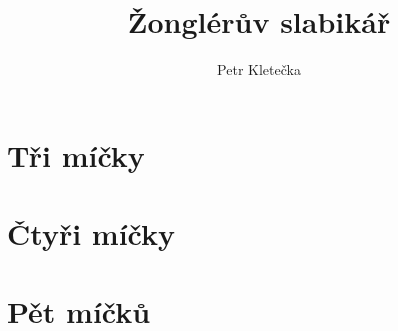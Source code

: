 \documentclass[12pt,a4paper,twoside]{book}
\begin{document}
\renewcommand{\arraystretch}{1.1}
\setlength{\parindent}{0pt}

\title{Žonglérův slabikář}
\author{Petr Kletečka}
\date{}
\maketitle
\setcounter{tocdepth}{1}
\tableofcontents

\chapter{Tři míčky}



\chapter{Čtyři míčky}



\chapter{Pět míčků}


\end{document}
